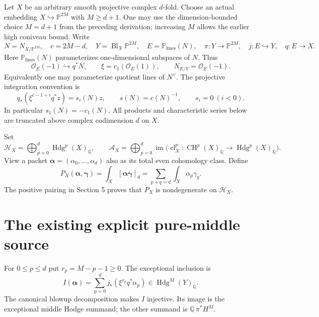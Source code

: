 \documentclass[11pt]{article}
\newcommand{\Q}{\mathbb Q}
\newcommand{\CH}{\operatorname{CH}}
\newcommand{\Hdg}{\operatorname{Hdg}}
\newcommand{\cl}{\operatorname{cl}}
\newcommand{\im}{\operatorname{im}}
\begin{document}
Let $X$ be an arbitrary smooth projective complex $d$-fold. Choose an
actual embedding $X\hookrightarrow\mathbb P^{2M}$ with $M\ge d+1$.
One may use the dimension-bounded choice $M=d+1$ from the preceding
derivation; increasing $M$ allows the earlier high coniveau bound.
Write
\[
 N=N_{X/\mathbb P^{2M}},\quad c=2M-d,\quad
 Y=\operatorname{Bl}_X\mathbb P^{2M},\quad
 E=\mathbb P_{\mathrm{lines}}(N),\quad
 \pi:Y\to\mathbb P^{2M},\quad j:E\hookrightarrow Y,\quad q:E\to X.
\]
Here $\mathbb P_{\mathrm{lines}}(N)$ parameterizes one-dimensional
subspaces of $N$. Thus
\[
 \mathcal O_E(-1)\hookrightarrow q^*N,\qquad
 \xi=c_1(\mathcal O_E(1)),\qquad
 N_{E/Y}=\mathcal O_E(-1).
 \tag{1.1}
\]
Equivalently one may parameterize quotient lines of $N^\vee$.
The projective integration convention is
\[
 q_*(\xi^{c-1+i}q^*z)=s_i(N)z,\qquad
 s(N)=c(N)^{-1},\qquad s_i=0\ (i<0).
 \tag{1.2}
\]
In particular $s_1(N)=-c_1(N)$. All products and characteristic
series below are truncated above complex codimension $d$ on $X$.

Set
\[
 \mathcal H_X=\bigoplus_{p=0}^{d}\Hdg^p(X)_{\Q},\qquad
 \mathcal A_X=\bigoplus_{p=0}^{d}
   \im\bigl(\cl_X^p:\CH^p(X)_{\Q}\to\Hdg^p(X)_{\Q}\bigr).
 \tag{1.3}
\]
View a packet $\boldsymbol\alpha=(\alpha_0,\ldots,\alpha_d)$ also
as its total even cohomology class. Define
\[
 P_X(\boldsymbol\alpha,\boldsymbol\gamma)
   =\int_X[\boldsymbol\alpha\boldsymbol\gamma]_d
   =\sum_{p+q=d}\int_X\alpha_p\gamma_q.
 \tag{1.4}
\]
The positive pairing in Section 5 proves that $P_X$ is
nondegenerate on $\mathcal H_X$.

\section{The existing explicit pure-middle source}
For $0\le p\le d$ put $r_p=M-p-1\ge0$. The exceptional inclusion is
\[
 I(\boldsymbol\alpha)
   =\sum_{p=0}^{d}j_*(\xi^{r_p}q^*\alpha_p)
   \in\Hdg^M(Y)_{\Q}.
 \tag{2.1}
\]
The canonical blowup decomposition makes $I$ injective. Its image is
the exceptional middle Hodge summand; the other summand is
$\Q\,\pi^*H^M$.
\end{document}
